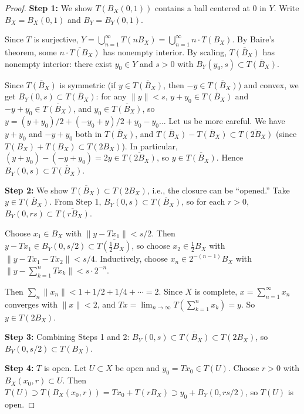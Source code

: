 \documentclass[11pt,a4paper]{article}
\theoremstyle{definition}
\theoremstyle{plain}
\theoremstyle{remark}
\begin{document}
\begin{proof}
\textbf{Step 1:} We show $T(B_X(0, 1))$ contains a ball centered at 0 in $Y$.
Write $B_X = B_X(0,1)$ and $B_Y = B_Y(0,1)$.

Since $T$ is surjective, $Y = \bigcup_{n=1}^\infty T(nB_X) = \bigcup_{n=1}^\infty n \cdot T(B_X)$.
By Baire's theorem, some $\overline{n \cdot T(B_X)}$ has nonempty interior.
By scaling, $\overline{T(B_X)}$ has nonempty interior: there exist
$y_0 \in Y$ and $s > 0$ with $B_Y(y_0, s) \subset \overline{T(B_X)}$.

Since $\overline{T(B_X)}$ is symmetric (if $y \in \overline{T(B_X)}$, then
$-y \in \overline{T(B_X)}$) and convex, we get
$B_Y(0, s) \subset \overline{T(B_X)}$: for any $\|y\| < s$,
$y + y_0 \in \overline{T(B_X)}$ and $-y + y_0 \in \overline{T(B_X)}$,
and $y_0 \in \overline{T(B_X)}$, so
$y = (y + y_0)/2 + (-y_0 + y)/2 + y_0 - y_0$... Let us be more careful.
We have $y + y_0$ and $-y + y_0$ both in $\overline{T(B_X)}$, and
$\overline{T(B_X)} - \overline{T(B_X)} \subset \overline{T(2B_X)}$
(since $T(B_X) + T(B_X) \subset T(2B_X)$). In particular,
$(y + y_0) - (-y + y_0) = 2y \in \overline{T(2B_X)}$, so
$y \in \overline{T(B_X)}$. Hence $B_Y(0, s) \subset \overline{T(B_X)}$.

\textbf{Step 2:} We show $\overline{T(B_X)} \subset T(2B_X)$, i.e.,
the closure can be ``opened.'' Take $y \in \overline{T(B_X)}$. From Step 1,
$B_Y(0, s) \subset \overline{T(B_X)}$, so for each $r > 0$,
$B_Y(0, rs) \subset \overline{T(rB_X)}$.

Choose $x_1 \in B_X$ with $\|y - Tx_1\| < s/2$. Then
$y - Tx_1 \in B_Y(0, s/2) \subset \overline{T(\frac{1}{2}B_X)}$, so choose
$x_2 \in \frac{1}{2}B_X$ with $\|y - Tx_1 - Tx_2\| < s/4$.
Inductively, choose $x_n \in 2^{-(n-1)} B_X$ with
$\|y - \sum_{k=1}^n Tx_k\| < s \cdot 2^{-n}$.

Then $\sum_n \|x_n\| < 1 + 1/2 + 1/4 + \cdots = 2$. Since $X$ is complete,
$x = \sum_{n=1}^\infty x_n$ converges with $\|x\| < 2$, and
$Tx = \lim_{n \to \infty} T(\sum_{k=1}^n x_k) = y$. So $y \in T(2B_X)$.

\textbf{Step 3:} Combining Steps 1 and 2:
$B_Y(0, s) \subset \overline{T(B_X)} \subset T(2B_X)$, so
$B_Y(0, s/2) \subset T(B_X)$.

\textbf{Step 4:} $T$ is open. Let $U \subset X$ be open and $y_0 = Tx_0 \in T(U)$.
Choose $r > 0$ with $B_X(x_0, r) \subset U$. Then
$T(U) \supset T(B_X(x_0, r)) = Tx_0 + T(rB_X) \supset y_0 + B_Y(0, rs/2)$,
so $T(U)$ is open.
\end{proof}
\end{document}
